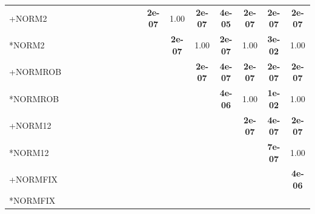 \begin{table}[t]
{\begin{tabular}{lcccccccccccccccc}
+NORM2 &  &  &  &  &  &  &  &  &  & \textbf{2e-07} & 1.00 & \textbf{2e-07} & \textbf{4e-05} & \textbf{2e-07} & \textbf{2e-07} & \textbf{2e-07} \\
*NORM2 &  &  &  &  &  &  &  &  &  &  & \textbf{2e-07} & 1.00 & \textbf{2e-07} & 1.00 & \textbf{3e-02} & 1.00 \\
+NORMROB &  &  &  &  &  &  &  &  &  &  &  & \textbf{2e-07} & \textbf{4e-07} & \textbf{2e-07} & \textbf{2e-07} & \textbf{2e-07} \\
*NORMROB &  &  &  &  &  &  &  &  &  &  &  &  & \textbf{4e-06} & 1.00 & \textbf{1e-02} & 1.00 \\
+NORM12 &  &  &  &  &  &  &  &  &  &  &  &  &  & \textbf{2e-07} & \textbf{4e-07} & \textbf{2e-07} \\
*NORM12 &  &  &  &  &  &  &  &  &  &  &  &  &  &  & \textbf{7e-07} & 1.00 \\
+NORMFIX &  &  &  &  &  &  &  &  &  &  &  &  &  &  &  & \textbf{4e-06} \\
*NORMFIX &  &  &  &  &  &  &  &  &  &  &  &  &  &  &  &  \\
\bottomrule
\end{tabular}
}
\end{table}

